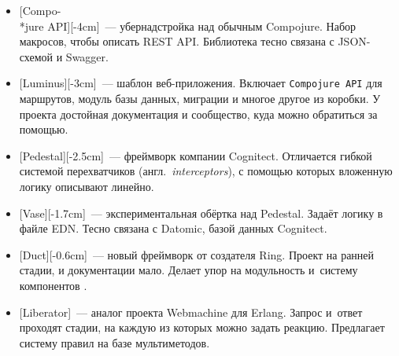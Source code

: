 \begin{itemize}


\item
  [Compo-\\*jure API][-4cm]~---
  убернадстройка над обычным Compojure. Набор макросов, чтобы описать REST
  API. Библиотека тесно связана с JSON-схемой и Swagger.


\item
  [Luminus][-3cm]~--- шаблон
  веб-приложения. Включает \verb|Compojure API| для маршрутов, модуль базы
  данных, миграции и многое другое из коробки. У проекта достойная документация
  и сообщество, куда можно обратиться за помощью.


\item
  [Pedestal][-2.5cm]~--- фреймворк
  компании Cognitect. Отличается гибкой системой перехватчиков
  (англ.~\emph{interceptors}), с помощью которых вложенную логику описывают
  линейно.


\item
  [Vase][-1.7cm]~---
  экспериментальная обёртка над Pedestal. Задаёт логику в файле
  EDN. Тесно связана с Datomic, базой данных Cognitect.


\item
  [Duct][-0.6cm]~--- новый
  фреймворк от создателя Ring. Проект на ранней стадии, и документации
  мало. Делает упор на модульность и~систему компонентов .


\item
  [Liberator]~---
  аналог проекта Webmachine для Erlang. Запрос и~ответ проходят стадии, на
  каждую из которых можно задать реакцию. Предлагает систему правил на базе
  мультиметодов.

\end{itemize}

